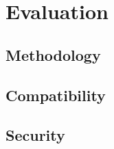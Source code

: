 \chapter{Evaluation}
\label{cha:Empirical Evaluation}

\section{Methodology}

\section{Compatibility}

\section{Security}